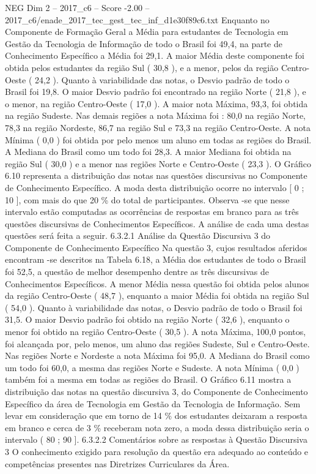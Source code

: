 \begin{textsample}{NEG Dim 2 – 2017\_c6 – Score -2.00 – 2017\_c6/enade\_2017\_tec\_gest\_tec\_inf\_d1e30f89c6.txt}
Enquanto no Componente de Formação Geral a Média para estudantes de Tecnologia em Gestão da Tecnologia de Informação de todo o Brasil foi 49,4, na parte de Conhecimento Específico a Média foi 29,1.
A maior Média deste componente foi obtida pelos estudantes da região Sul ( 30,8 ), e a menor, pelos da região Centro-Oeste ( 24,2 ).
Quanto à variabilidade das notas, o Desvio padrão de todo o Brasil foi 19,8.
O maior Desvio padrão foi encontrado na região Norte ( 21,8 ), e o menor, na região Centro-Oeste ( 17,0 ).
A maior nota Máxima, 93,3, foi obtida na região Sudeste.
Nas demais regiões a nota Máxima foi : 80,0 na região Norte, 78,3 na região Nordeste, 86,7 na região Sul e 73,3 na região Centro-Oeste.
A nota Mínima ( 0,0 ) foi obtida por pelo menos um aluno em todas as regiões do Brasil.
A Mediana do Brasil como um todo foi 28,3.
A maior Mediana foi obtida na região Sul ( 30,0 ) e a menor nas regiões Norte e Centro-Oeste ( 23,3 ).
O Gráfico 6.10 representa a distribuição das notas nas questões discursivas no Componente de Conhecimento Específico.
A moda desta distribuição ocorre no intervalo [ 0 ; 10 ], com mais do que 20 \% do total de participantes.
Observa -se que nesse intervalo estão computadas as ocorrências de respostas em branco para as três questões discursivas de Conhecimentos Específicos.
A análise de cada uma destas questões será feita a seguir. 6.3.2.1 Análise da Questão Discursiva 3 do Componente de Conhecimento Específico Na questão 3, cujos resultados aferidos encontram -se descritos na Tabela 6.18, a Média dos estudantes de todo o Brasil foi 52,5, a questão de melhor desempenho dentre as três discursivas de Conhecimentos Específicos.
A menor Média nessa questão foi obtida pelos alunos da região Centro-Oeste ( 48,7 ), enquanto a maior Média foi obtida na região Sul ( 54,0 ).
Quanto à variabilidade das notas, o Desvio padrão de todo o Brasil foi 31,5.
O maior Desvio padrão foi obtido na região Norte ( 32,6 ), enquanto o menor foi obtido na região Centro-Oeste ( 30,5 ).
A nota Máxima, 100,0 pontos, foi alcançada por, pelo menos, um aluno das regiões Sudeste, Sul e Centro-Oeste.
Nas regiões Norte e Nordeste a nota Máxima foi 95,0.
A Mediana do Brasil como um todo foi 60,0, a mesma das regiões Norte e Sudeste.
A nota Mínima ( 0,0 ) também foi a mesma em todas as regiões do Brasil.
O Gráfico 6.11 mostra a distribuição das notas na questão discursiva 3, do Componente de Conhecimento Específico da área de Tecnologia em Gestão da Tecnologia de Informação.
Sem levar em consideração que em torno de 14 \% dos estudantes deixaram a resposta em branco e cerca de 3 \% receberam nota zero, a moda dessa distribuição seria o intervalo ( 80 ; 90 ]. 6.3.2.2 Comentários sobre as respostas à Questão Discursiva 3 O conhecimento exigido para resolução da questão era adequado ao conteúdo e competências presentes nas Diretrizes Curriculares da Área.

\end{textsample}
